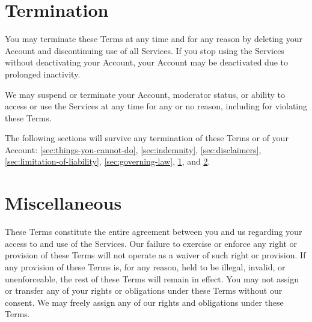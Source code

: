 \documentclass[10pt]{article}
\begin{document}
\section{Termination}
\label{sec:termination}
You may terminate these Terms at any time and for any reason by deleting your Account and discontinuing use of all Services. If you stop using the Services without deactivating your Account, your Account may be deactivated due to prolonged inactivity.

We may suspend or terminate your Account, moderator status, or ability to access or use the Services at any time for any or no reason, including for violating these Terms.

The following sections will survive any termination of these Terms or of your Account: \ref{sec:things-you-cannot-do}, \ref{sec:indemnity}, \ref{sec:disclaimers}, \ref{sec:limitation-of-liability}, \ref{sec:governing-law}, \ref{sec:termination}, and \ref{sec:miscellaneous}.


\section{Miscellaneous}
\label{sec:miscellaneous}
These Terms constitute the entire agreement between you and us regarding your access to and use of the Services. Our failure to exercise or enforce any right or provision of these Terms will not operate as a waiver of such right or provision. If any provision of these Terms is, for any reason, held to be illegal, invalid, or unenforceable, the rest of these Terms will remain in effect. You may not assign or transfer any of your rights or obligations under these Terms without our consent. We may freely assign any of our rights and obligations under these Terms.
\end{document}
